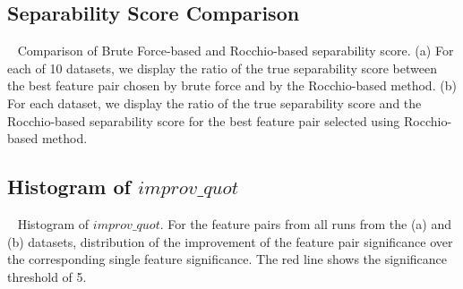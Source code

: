 \subsection{Separability Score Comparison}~\label{appF:exp_sep}
Comparison of Brute Force-based and Rocchio-based separability score. (a) For each of 10 datasets, we display the ratio of the true separability score between the best feature pair chosen by brute force and by the Rocchio-based method. (b) For each dataset, we display the ratio of the true separability score and the Rocchio-based separability score for the best feature pair selected using Rocchio-based method.
\begin{figure}[!htb]
\centering %
\vspace{-5mm}
\vspace{-5mm}
\label{fig:brute_rocchio}
\end{figure}


\subsection{Histogram of $improv\_quot$}~\label{appF_exp_hist}
Histogram of $improv\_quot$. For the \toptwenty feature pairs from all runs from the (a) \msig and (b) \lincs datasets, distribution of the improvement of the feature pair significance over the corresponding single feature significance. The red line shows the significance threshold of 5.
\begin{figure}[!htb]
\centering %
\vspace{-5mm}
\vspace{-3mm}
\label{fig:histogram_diff}
\end{figure}
